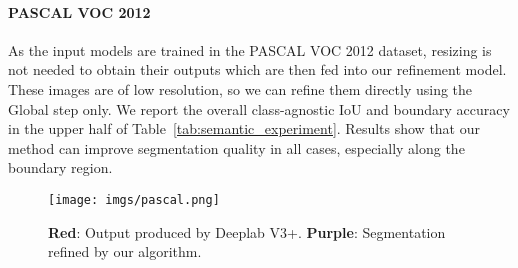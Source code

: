 \documentclass[10pt,twocolumn,letterpaper]{article}
\begin{document}
\vspace{-0.1in}
\paragraph{PASCAL VOC 2012}
As the input models are trained in the PASCAL VOC 2012 dataset, 
resizing is not needed to obtain their outputs
which are then fed into our refinement model. These images are of low resolution, so we can refine them directly using the Global step only. 
We report the overall class-agnostic IoU and boundary accuracy in the upper half of Table~\ref{tab:semantic_experiment}. 
Results show that our method can improve segmentation quality in all cases, especially along the boundary region.

\begin{figure}[h]
\centering
	\texttt{[image: imgs/pascal.png]}
	\caption{\textbf{Red}: Output produced by Deeplab V3+. 
	\textbf{Purple}: Segmentation refined by our algorithm.}
	\label{fig:pascal_fine_results}
	\vspace{-0.15in}
\end{figure}
\end{document}
